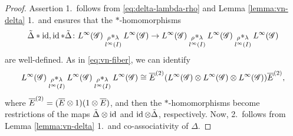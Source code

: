 \begin{proof}
Assertion 1.\ follows from \eqref{eq:delta-lambda-rho} and
Lemma \ref{lemma:vn-delta} 1.\ and ensures that  the $*$-homo\-morphisms
\begin{align*}
  \tilde\Delta \ast \id, \id \ast \tilde\Delta \colon  \LGinf \astrl \LGinf
  \to \LGinf \astrl \LGinf \astrl \LGinf
\end{align*}
are well-defined.  As in
\eqref{eq:vn-fiber}, we can identify
\begin{align*}
 \LGinf \astrl \LGinf \astrl \LGinf \cong \vnE^{(2)}(\LGinf
  \otimes \LGinf \otimes \LGinf)\vnE^{(2)},
\end{align*}
where $\vnE^{(2)}=(\vnE \otimes 1)(1 \otimes \vnE)$, and then the
$*$-homomorphisms become restrictions of the maps $\tilde\Delta \otimes
\id$ and $\id \otimes \tilde\Delta$, respectively. Now, 2.\ follows from
Lemma \ref{lemma:vn-delta} 1.\ and co-associativity of $\Delta$.
\end{proof}

